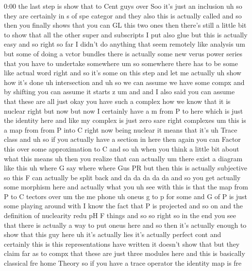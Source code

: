 \begin{unfinished}{0:00}
the  last  step  is  show
that  to  Cent  guys
over  Soo  it's  just  an
inclusion  uh  so  they  are  certainly  in  s
of  spe
categor  and  they
also  this  is  actually
called  and  so  then  you  finally  shows
that  you  can  GL  this  two  ones  then
there's  still  a  little  bit  to  show  that
all  the  other  super  and  subscripts  I  put
also  glue  but  this  is  actually
easy
and
so  right  so  far  I  didn't  do  anything
that  seem  remotely  like
analysis  um  but  some  of  doing  a  vctor
bundles  there  is  actually  some  new  verus
power  series  that  you  have  to  undertake
somewhere  um  so  somewhere  there  has  to
be  some  like  actual  word  right  and  so
it's  some  on  this  step  and  let  me
actually  uh  show  how  it's  done
uh
intersection  and  uh  so  we  can  assume  we
have  some  compx  and  by  shifting  you  can
assume  it  starts  z
um
and  and  I  also  said  you  can  assume  that
these  are  all  just
okay  you  have  such  a  complex  how  we  know
that  it  is
nuclear
right  but
now  but  now  I  certainly  have  a  m  from  P
to  here  which  is  just  the  identity  here
and  like  my  complex  is  just  zero  sare
right
complexes  um  this  is  a  map  from  from  P
into  C
right  now  being  nuclear  it  means  that
it's  uh  Trace
class  and  uh  so  if  you  actually  have  a
section  in  here  then  again  you  can
Factor  this  over  some  approximation  to  C
and  so  uh  when  you  think  a  little  bit
about  what  this  means  uh  then  you
realize  that  can
actually
um  there  exist  a  diagram  like
this  uh
where  G  say  where  where  Gus
PR  but  then  this  is  actually  subjective
so  this  F  can  actually  be  split  back  and
da  da  da  da  da  and  so  you  get  actually
some  morphism  here  and
actually  what  you  uh  see  with  this  is
that  the
map  from  P  to
C  tectors
over  um  the  me
phone  uh
oneus  g  to  p  for  some  and  G  of
P
is  just  some  playing  around  with  I  know
the  fact  that  P  is  projected  and  so  on
and  the  definition  of  nuclearity  redu  pH
F  things  and  so
so  right
so  in  the  end  you  see  that  there  is
actually  a  way  to  put  oneus
here
and  so  then  it's  actually  enough  to  show
that  this  guy
here  uh  it's  actually  lies  it's  actually
perfect
cont  and  certainly  this  is  this
representations  have  written  it  doesn't
show  that  but  they  claim  far  as  to  compx
that  these  are  just  three  modules
here  and  this  is  basically  classical  fre
home  Theory  so  if  you  have  a  trace
operator  the  identity  map  is  fre

\end{unfinished}
